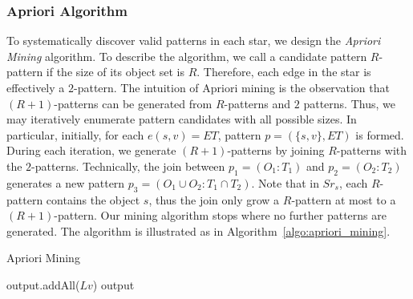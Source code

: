 











\subsubsection{Apriori Algorithm}

To systematically discover valid patterns in each star, 
we design the \emph{Apriori Mining} algorithm. 
To describe the  algorithm, we call a candidate pattern $R$-pattern 
if the size of its object set is $R$.  Therefore, each edge
in the star is effectively a $2$-pattern. The intuition of Apriori mining
is the observation that $(R+1)$-patterns can be generated
from $R$-patterns and $2$ patterns. Thus, we may iteratively 
enumerate pattern candidates with all possible sizes.
In particular, initially, for each $e(s,v)=ET$, pattern $p=(\{s,v\}, ET)$ is formed. 
During each iteration, we generate $(R+1)$-patterns by joining $R$-patterns 
with the $2$-patterns. Technically, the join between $p_1=(O_1:T_1)$ and $p_2=(O_2:T_2)$
generates a new pattern $p_3=(O_1 \cup O_2:T_1 \cap T_2)$. Note that in $Sr_s$,
each $R$-pattern contains the object $s$, thus the join only 
grow a $R$-pattern at most to a $(R+1)$-pattern.
Our mining algorithm stops where no further patterns are generated. 
The algorithm is illustrated as in Algorithm~\ref{algo:apriori_mining}.

\begin{algorithm}
\caption{Apriori Mining}
\label{algo:apriori_mining}
\begin{algorithmic}[1]
 
\EndFor
{}
		 
		\EndIf
\EndWhile
\State output.addAll($Lv$)
\State \Return output
\end{algorithmic}
\end{algorithm}
 

